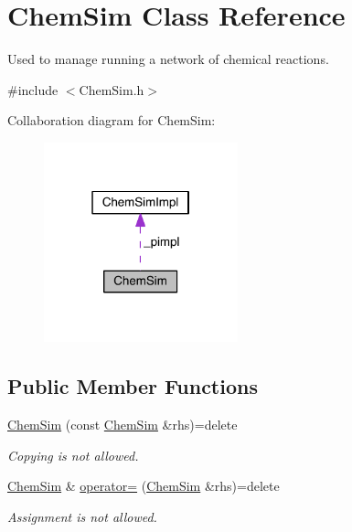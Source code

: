 \hypertarget{classChemSim}{\section{Chem\+Sim Class Reference}
\label{classChemSim}
}


Used to manage running a network of chemical reactions.  




{\ttfamily \#include $<$Chem\+Sim.\+h$>$}



Collaboration diagram for Chem\+Sim\+:\nopagebreak
\begin{figure}[H]
\begin{center}
\leavevmode
\includegraphics[width=159pt]{classChemSim__coll__graph}
\end{center}
\end{figure}
\subsection*{Public Member Functions}
\begin{DoxyCompactItemize}
\item 
\hyperlink{classChemSim_a4b06224f48b2c5ef649a177931ecd5f6}{Chem\+Sim} (const \hyperlink{classChemSim}{Chem\+Sim} \&rhs)=delete
\begin{DoxyCompactList}\small\item\em Copying is not allowed. \end{DoxyCompactList}\item 
\hyperlink{classChemSim}{Chem\+Sim} \& \hyperlink{classChemSim_aeb69f4407d4ae03a7e813be403247f7c}{operator=} (\hyperlink{classChemSim}{Chem\+Sim} \&rhs)=delete
\begin{DoxyCompactList}\small\item\em Assignment is not allowed. \end{DoxyCompactList}\end{DoxyCompactItemize}
